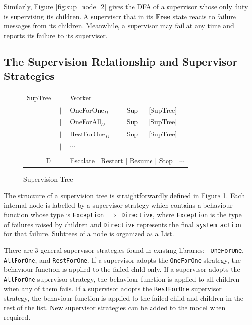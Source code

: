 Similarly, Figure \ref{fig:sup_node_2} gives the DFA of a supervisor whose only 
duty is supervising its children.  A supervisor that in its {\bf Free} state 
reacts to failure messages from its children.  Meanwhile, a supervisor may fail 
at any time and reports its failure to its supervisor.

\subsection{The Supervision Relationship and Supervisor Strategies}
\label{supevision_tree_model}

\begin{figure}[h]
 \label{supevision_tree_fig} 
 \begin{tabular}{r c l l l}
 SupTree & =   & Worker &&\\
         & $|$ & OneForOne$_D$  & Sup & [SupTree] \\
         & $|$ & OneForAll$_D$  & Sup & [SupTree] \\
         & $|$ & RestForOne$_D$ & Sup & [SupTree] \\
         & $|$ & $\cdots$ &&\\
\\
 D & = & \multicolumn{3}{c}{Escalate $|$ Restart $|$ Resume $|$ 
Stop $|$ $\cdots$ } \\
         
 \end{tabular}
 \caption{Supervision Tree}
\end{figure}

The structure of a supervision tree is straightforwardly defined in Figure 
\ref{supevision_tree_fig}.  Each internal node is labelled by a supervisor 
strategy which contains a behaviour function whose type is {\tt Exception 
$\Rightarrow$ Directive}, where {\tt Exception} is the type of failures raised 
by children and {\tt Directive} represents the final {\tt system action} for 
that failure.  Subtrees of a node is organized as a List.

There are 3 general supervisor strategies found in existing libraries: {\tt 
OneForOne}, {\tt AllForOne}, and {\tt RestForOne}.  If a supervisor adopts the
{\tt OneForOne} strategy, the behaviour function is applied to the failed child 
only. If a supervisor adopts the {\tt AllForOne} supervisor strategy, the 
behaviour function is applied to all children when any of them fails.  If a 
supervisor adopts the {\tt RestForOne} supervisor strategy, the behaviour 
function is applied to the failed child and children in the rest of the list.  
New supervisor strategies can be added to the model when required.

